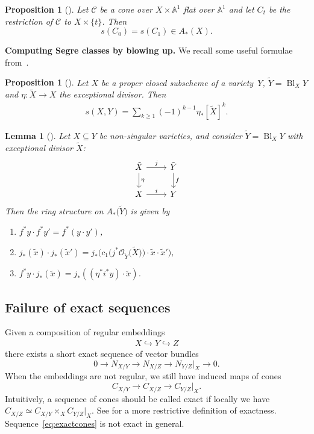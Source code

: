 \documentclass[pdftex]{sigma}
\numberwithin{equation}{section}
\newtheorem{Lemma}[Theorem]{Lemma}
\newtheorem{Proposition}[Theorem]{Proposition}
 { \theoremstyle{definition}
\newtheorem{Definition}[Theorem]{Definition}
\newtheorem{Note}[Theorem]{Note}
\newtheorem{Example}[Theorem]{Example}
\newtheorem{Remark}[Theorem]{Remark}
\newtheorem{notation}[Theorem]{Notation}
\newtheorem{construction}[Theorem]{Construction}
}
\begin{document}
\begin{Proposition}[{\cite[Examples~4.1.6, 10.1.10]{Fulton}}]\label{Segre constant}
Let $\mathcal{C}$ be a cone over $X\times \mathbb{A}^1$ flat over $\mathbb{A}^1$ and let $C_t$ be the restriction of $\mathcal C$ to $X\times\{t\}$. Then
\[
s(C_0)=s(C_1) \in A_*(X).
\]
\end{Proposition}

{\bf Computing Segre classes by blowing up.} We recall some useful formulae from~\cite{Fulton}.

\begin{Proposition}[{\cite[Corollary 4.2.2]{Fulton}}]\label{prop2}
Let $X$ be a proper closed subscheme of a variety~$Y$, $ \tilde{Y}=\operatorname{Bl}_X Y$ and $\eta\colon\tilde{X}\to X$ the exceptional divisor. Then
\begin{gather}\label{prop2-eq}s(X,Y)=\sum_{k\geq 1}{(-1)^{k-1}\eta_*[\tilde{X}]^k}.\end{gather}
\end{Proposition}

\begin{Lemma}[{\cite[Example~8.3.9]{Fulton}}]\label{blup_formulas}
Let $X\subseteq Y$ be non-singular varieties, and consider $\tilde{Y}=\operatorname{Bl}_X Y$ with exceptional divisor $\tilde{X}$:
\[
\begin{tikzcd}
\tilde{X}\ar[r,"j"]\ar[d,"\eta"] & \tilde{Y}\ar[d,"f"] \\
X\ar[r,"i"] & Y
\end{tikzcd}
\]
Then the ring structure on $A_*\big(\tilde{Y}\big)$ is given by
\begin{enumerate}\itemsep=0pt
\item[$(i)$] $f^*y\cdot f^* y'=f^*(y\cdot y')$,
\item[$(ii)$] $j_*(\tilde{x})\cdot j_*(\tilde{x}')=j_*\big(c_1\big(j^*\mathcal O_{\tilde{Y}}\big(\tilde{X}\big)\big)\cdot \tilde{x}\cdot \tilde{x}'\big)$,
\item[$(iii)$] $f^*y\cdot j_*(\tilde{x})=j_*((\eta^* i^* y)\cdot\tilde{x})$.
\end{enumerate}			
\end{Lemma}

\subsection{Failure of exact sequences}	
Given a composition of regular embeddings \begin{gather*}X\hookrightarrow Y\hookrightarrow Z\end{gather*} there exists a short exact sequence of vector bundles
\[0\to N_{X/Y}\to N_{X/Z}\to N_{Y/Z}\rvert_X\to 0.\]
When the embeddings are not regular, we still have induced maps of cones
\begin{equation}\label{eq:exactcones}
C_{X/Y}\to C_{X/Z}\to C_{Y/Z}\rvert_X.\end{equation}
Intuitively, a sequence of cones should be called exact if locally we have $C_{X/Z}\simeq C_{X/Y}\times_X C_{Y/Z}\rvert_X$. See \cite[Example~4.1.6]{Fulton} for a more restrictive definition of exactness. Sequence~\eqref{eq:exactcones} is not exact in general.
\end{document}
